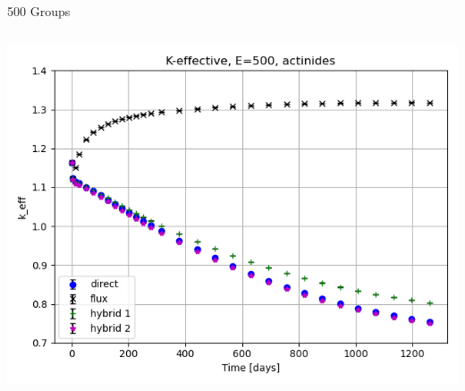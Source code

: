 \documentclass[
	11pt, %
	aspectratio=169, %
]{beamer}
\begin{document}
\begin{frame}{500 Groups}
	\begin{columns}[c] %
		\begin{column}{0.32\textwidth} %
			\includegraphics[width=\textwidth]{../figures/keff/keff_actinides_500.png}


\end{column}
\end{columns}
\end{frame}
\end{document}
